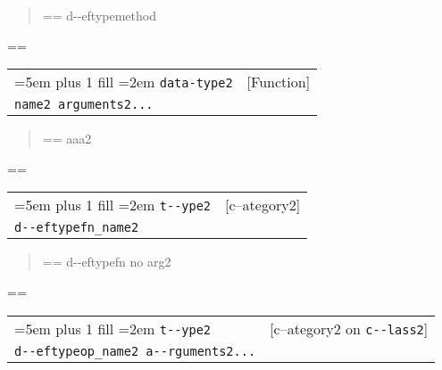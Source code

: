 \documentclass{book}
\makeatletter
\newenvironment{GNUTexinfopreformatted}{%
  \par\GNUTobeylines\obeyspaces\frenchspacing
  \parskip=\z@\parindent=\z@}{}
{\catcode`\^^M=13 \gdef\GNUTobeylines{\catcode`\^^M=13 \def^^M{\null\par}}}
\newenvironment{GNUTexinfoindented}
  {\begin{list}{}{}
  \item\relax}
  {\end{list}}
\makeatother
\begin{document}
\begin{GNUTexinfoindented}
%
\begin{quote}
\unskip{\parskip=0pt\noindent}%
\begin{GNUTexinfopreformatted}%
\ttfamily d{-}{-}eftypemethod
\end{GNUTexinfopreformatted}
\end{quote}
\begin{GNUTexinfopreformatted}%
\ttfamily 

\end{GNUTexinfopreformatted}

\noindent\begin{tabularx}{\linewidth}{@{}Xr}
\rightskip=5em plus 1 fill
\hangindent=2em
\texttt{data-type2}& [Function]\\
\texttt{name2 arguments2...}\end{tabularx}

%
\begin{quote}
\unskip{\parskip=0pt\noindent}%
\begin{GNUTexinfopreformatted}%
\ttfamily aaa2
\end{GNUTexinfopreformatted}
\end{quote}
\begin{GNUTexinfopreformatted}%
\ttfamily 
\end{GNUTexinfopreformatted}

\noindent\begin{tabularx}{\linewidth}{@{}Xr}
\rightskip=5em plus 1 fill
\hangindent=2em
\texttt{t{-}{-}ype2}& [c--ategory2]\\
\texttt{d{-}{-}eftypefn\_name2}\end{tabularx}

%
\begin{quote}
\unskip{\parskip=0pt\noindent}%
\begin{GNUTexinfopreformatted}%
\ttfamily d{-}{-}eftypefn no arg2
\end{GNUTexinfopreformatted}
\end{quote}
\begin{GNUTexinfopreformatted}%
\ttfamily 
\end{GNUTexinfopreformatted}

\noindent\begin{tabularx}{\linewidth}{@{}Xr}
\rightskip=5em plus 1 fill
\hangindent=2em
\texttt{t{-}{-}ype2}& [c--ategory2 on \texttt{c{-}{-}lass2}]\\
\texttt{d{-}{-}eftypeop\_name2 a{-}{-}rguments2...}\end{tabularx}


\end{GNUTexinfoindented}
\end{document}
